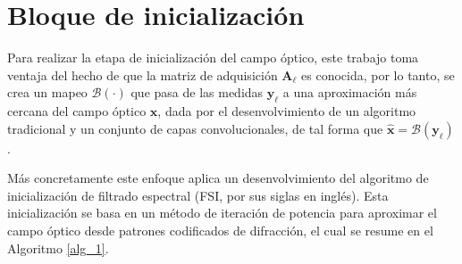 \section{Bloque de inicialización}

Para realizar la etapa de inicialización del campo óptico, este trabajo toma ventaja del hecho de que la matriz de adquisición $\mathbf{A}_\ell$ es conocida, por lo tanto, se crea un mapeo $\mathcal{B}(\cdot)$ que pasa de las medidas $\mathbf{y}_\ell$ a una aproximación más cercana del campo óptico $\mathbf{x}$, dada por el desenvolvimiento de un algoritmo tradicional y un conjunto de capas convolucionales, de tal forma que $\hat{\mathbf{x}}=\mathcal{B}(\mathbf{y}_\ell)$. 



Más concretamente este enfoque aplica un desenvolvimiento del algoritmo de inicialización de filtrado espectral (FSI, por sus siglas en inglés). Esta inicialización se basa en un método de iteración de potencia para aproximar el campo óptico desde patrones codificados de difracción, el cual se resume en el Algoritmo \ref{alg_1}.

